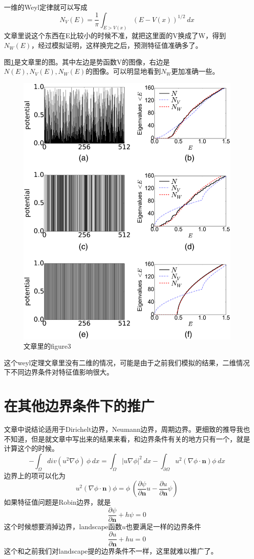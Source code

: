 \documentclass[UTF8,12pt]{article}
\begin{document}
一维的Weyl定律就可以写成
$$ N_V(E) = \frac{1}{\pi} \int_{E > V(x)} (E - V(x))^{1/2}  \ dx $$
文章里说这个东西在E比较小的时候不准，就把这里面的V换成了W，得到$N_W(E)$，经过模拟证明，这样换完之后，预测特征值准确多了。

图\ref{article3}是文章里的图。其中左边是势函数V的图像，右边是$N(E),N_V(E),N_W(E)$的图像。可以明显地看到$N_W$更加准确一些。

\begin{figure}[htbp]
\centering
\includegraphics[width=0.7\linewidth]{article3}
\caption{文章里的figure3}
\label{article3}
\end{figure}

这个weyl定理文章里没有二维的情况，可能是由于之前我们模拟的结果，二维情况下不同边界条件对特征值影响很大。

\section{在其他边界条件下的推广}

文章中说结论适用于Dirichelt边界，Neumann边界，周期边界。更细致的推导我也不知道，但是就文章中写出来的结果来看，和边界条件有关的地方只有一个，就是计算这个的时候。
$$ - \int_\Omega div(u^2 \nabla \phi) \ \phi \ dx = \int_\Omega |u \nabla \phi|^2 \ dx - \int_{\partial \Omega} u^2 (\nabla \phi \cdot \mathbf{n}) \phi \ dx $$
边界上的项可以化为
$$ u^2 (\nabla \phi \cdot \mathbf{n}) \phi = \phi \ (\frac{\partial \psi}{\partial \mathbf{n}} u - \frac{\partial u}{\partial \mathbf{n}} \psi) $$
如果特征值问题是Robin边界，就是
$$ \frac{\partial \psi}{\partial \mathbf{n}} + h \psi = 0 $$
这个时候想要消掉边界，landscape函数$u$也要满足一样的边界条件
$$ \frac{\partial u}{\partial \mathbf{n}} + h u = 0 $$
这个和之前我们对landscape提的边界条件不一样，这里就难以推广了。
\end{document}
